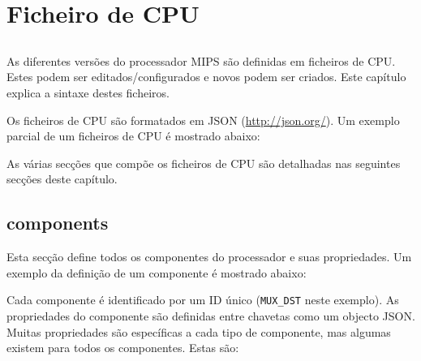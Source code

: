 \documentclass[11pt,a4paper,twoside,titlepage]{report}
\author{Bruno Nova}
\title{\Title}
\begin{document}
\maketitle
\tableofcontents

\chapter{Ficheiro de CPU}

\section*{}

As diferentes versões do processador MIPS são definidas em ficheiros de CPU.
Estes podem ser editados/configurados e novos podem ser criados.
Este capítulo explica a sintaxe destes ficheiros.

Os ficheiros de CPU são formatados em JSON (\url{http://json.org/}).
Um exemplo parcial de um ficheiros de CPU é mostrado abaixo:



As várias secções que compõe os ficheiros de CPU são detalhadas nas seguintes
secções deste capítulo.


\section{components}

Esta secção define todos os componentes do processador e suas propriedades.
Um exemplo da definição de um componente é mostrado abaixo:



Cada componente é identificado por um ID único (\verb+MUX_DST+ neste exemplo).
As propriedades do componente são definidas entre chavetas como um objecto
JSON. Muitas propriedades são específicas a cada tipo de componente, mas
algumas existem para todos os componentes. Estas são:
\end{document}
